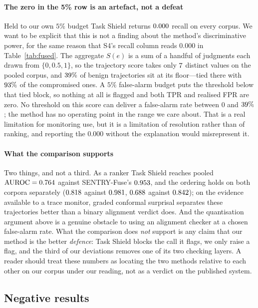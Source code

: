 \documentclass[preprint,12pt,authoryear]{elsarticle}
\theoremstyle{definition}
\begin{document}
\paragraph{The zero in the 5\% row is an artefact, not a defeat} Held to our own
$5\%$ budget Task Shield returns $0.000$ recall on every corpus. We want to be
explicit that this is not a finding about the method's discriminative power, for
the same reason that S4's recall column reads $0.000$ in
Table~\ref{tab:fused}. The aggregate $S(e)$ is a sum of a handful of judgments each
drawn from $\{0, 0.5, 1\}$, so the trajectory score takes only $7$
distinct values on the pooled corpus, and $39\%$ of benign
trajectories sit at its floor---tied there with $93\%$ of the
compromised ones. A $5\%$ false-alarm budget puts the threshold below that tied
block, so nothing at all is flagged and both TPR and realised FPR are zero. No
threshold on this score can deliver a false-alarm rate between $0$ and
$39\%$; the method has no operating point in the range we care
about. That is a real limitation for monitoring use, but it is a limitation of
resolution rather than of ranking, and reporting the $0.000$ without the
explanation would misrepresent it.

\paragraph{What the comparison supports} Two things, and not a third. As a ranker
Task Shield reaches pooled $\mathrm{AUROC} = 0.764$ against SENTRY-Fuse's
$0.953$, and the ordering holds on both corpora separately
($0.818$ against $0.981$, $0.688$ against $0.842$); on
the evidence available to a trace monitor, graded conformal surprisal separates
these trajectories better than a binary alignment verdict does. And the
quantisation argument above is a genuine obstacle to using an alignment checker at
a chosen false-alarm rate. What the comparison does \emph{not} support is any
claim that our method is the better \emph{defence}: Task Shield blocks the call it
flags, we only raise a flag, and the third of our deviations removes one of its two
checking layers. A reader should treat these numbers as locating the two methods
relative to each other on our corpus under our reading, not as a verdict on the
published system.


\subsection{Negative results}\label{sec:negatives}
\end{document}
